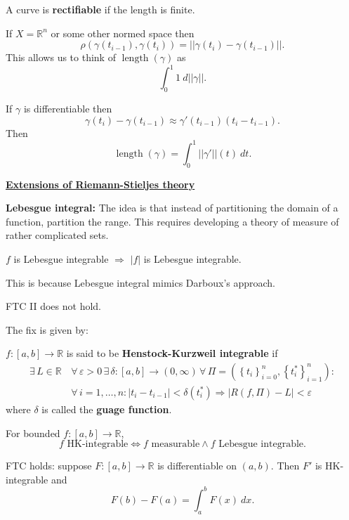 \documentclass{notes}
\begin{document}
\begin{rmk}
\begin{itemize}
    A curve is {\boldmath \bfseries rectifiable} if the length is finite.
    
    If $X = \mathbb R^n$ or some other normed space then 
    \[
      \rho(\gamma(t_{i - 1}), \gamma(t_i)) = || \gamma(t_i) - \gamma(t_{i - 1}) ||.
    \]
    This allows us to think of $\operatorname{length}(\gamma)$ as 
    \[
      \int_0^1 1\ d||\gamma||.
    \]
    
    If $\gamma$ is differentiable then 
    \[
      \gamma(t_i) - \gamma(t_{i - 1}) \approx \gamma'(t_{i - 1}) (t_i - t_{i - 1}).
    \]
    Then 
    \[
      \operatorname{length}(\gamma) = \int_0^1 || \gamma' ||(t)\ dt.
    \]
  \end{itemize}
\end{rmk}

{\boldmath \bfseries \underline{Extensions of Riemann-Stieljes theory}}

{\boldmath \bfseries Lebesgue integral:} The idea is that instead of partitioning the domain of a function, partition the range.
This requires developing a theory of measure of rather complicated sets.

\begin{note}
  $f$ is Lebesgue integrable $\Rightarrow$ $\left | f \right |$ is Lebesgue integrable.
\end{note}

This is because Lebesgue integral mimics Darboux's approach.

FTC II does not hold.

The fix is given by: 
\begin{defn}
  $f \colon [a, b] \to \mathbb R$ is said to be {\boldmath \bfseries Henstock-Kurzweil integrable} if 
  \begin{align*}
    \exists \, L \in \mathbb R \, &\forall \, \varepsilon > 0 \, \exists \, \delta \colon [a, b] \to (0, \infty) \, \forall \, \Pi = (\left \{ t_i \right \}_{i = 0}^n, \left \{ t^*_i \right \}_{i = 1}^n): \\ 
    &\forall \, i = 1, \dots, n: \left | t_i - t_{i - 1} \right | < \delta(t^*_i) \Rightarrow \left | R(f, \Pi) - L \right | < \varepsilon
  \end{align*}
  where $\delta$ is called the {\boldmath \bfseries guage function}.
\end{defn}

For bounded $f \colon [a, b] \to \mathbb R$, 
\[
  f \text{ HK-integrable} \Leftrightarrow f \text{ measurable} \land f \text{ Lebesgue integrable}.
\]

FTC holds: suppose $F \colon [a, b] \to \mathbb R$ is differentiable on $(a, b)$.
Then $F'$ is HK-integrable and 
\[
  F(b) - F(a) = \int_a^b F(x)\ dx.
\]
\end{document}
